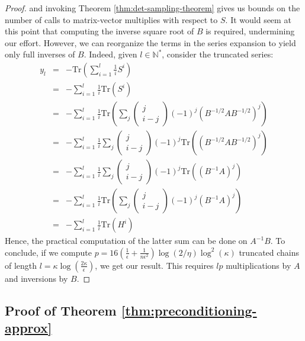 \begin{proof}
and invoking Theorem \ref{thm:det-sampling-theorem} gives us bounds
on the number of calls to matrix-vector multiplies with respect to
$S$. It would seem at this point that computing the inverse square
root of $B$ is required, undermining our effort. However, we can
reorganize the terms in the series expansion to yield only full inverses
of $B$. Indeed, given $l\in\mathbb{N}^{*}$, consider the truncated
series: 
\begin{eqnarray*}
y_{l} & = & -\mbox{Tr}\left(\sum_{i=1}^{l}\frac{1}{i}S^{i}\right)\\
 & = & -\sum_{i=1}^{l}\frac{1}{i}\mbox{Tr}\left(S^{i}\right)\\
 & = & -\sum_{i=1}^{l}\frac{1}{i}\mbox{Tr}\left(\sum_{j}\left(\begin{array}{c}
j\\
i-j
\end{array}\right)\left(-1\right)^{j}\left(B^{-1/2}AB^{-1/2}\right)^{j}\right)\\
 & = & -\sum_{i=1}^{l}\frac{1}{i}\sum_{j}\left(\begin{array}{c}
j\\
i-j
\end{array}\right)\left(-1\right)^{j}\mbox{Tr}\left(\left(B^{-1/2}AB^{-1/2}\right)^{j}\right)\\
 & = & -\sum_{i=1}^{l}\frac{1}{i}\sum_{j}\left(\begin{array}{c}
j\\
i-j
\end{array}\right)\left(-1\right)^{j}\mbox{Tr}\left(\left(B^{-1}A\right)^{j}\right)\\
 & = & -\sum_{i=1}^{l}\frac{1}{i}\mbox{Tr}\left(\sum_{j}\left(\begin{array}{c}
j\\
i-j
\end{array}\right)\left(-1\right)^{j}\left(B^{-1}A\right)^{j}\right)\\
 & = & -\sum_{i=1}^{l}\frac{1}{i}\mbox{Tr}\left(H^{i}\right)
\end{eqnarray*}
Hence, the practical computation of the latter sum can be done on
$A^{-1}B$. To conclude, if we compute $p=16\left(\frac{1}{\epsilon}+\frac{1}{n\epsilon^{2}}\right)\log\left(2/\eta\right)\log^{2}\left(\kappa\right)$
truncated chains of length $l=\kappa\log\left(\frac{2\kappa}{\epsilon}\right)$,
we get our result. This requires $lp$ multiplications by $A$ and
inversions by $B$. \end{proof} 


\subsection{Proof of Theorem \ref{thm:preconditioning-approx}}

